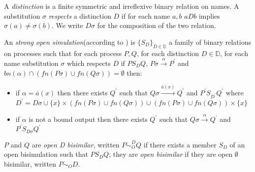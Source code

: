 \begin{definition}
  A \emph{distinction} is a finite symmetric and irreflexive binary relation on names. A substitution $\sigma$ \emph{respects} a distinction $D$ if for each name $a,b$ $aDb$ implies $\sigma(a)\neq \sigma(b)$. We write $D\sigma$ for the composition of the two relation.
\end{definition}


\begin{definition}
  An \emph{strong open simulation}(according to \cite{parrow}) is $\{S_{D}\}_{D\in \mathbb{D}}$ a family of binary relations on processes such that for each process $P, Q$, for each distinction $D\in \mathbb{D}$, for each name substitution $\sigma$ which respects $D$ if $P S_{D} Q$, $P\sigma \xrightarrow{\alpha} P^{'}$ and $bn(\alpha)\cap (fn(P\sigma)\cup fn(Q\sigma))=\emptyset$ then:
   \begin{itemize}
    \item 
      if $\alpha=\overline{a}(x)$ then there exists $Q^{'}$ such that $Q\sigma \xrightarrow{\overline{a}(x)} Q^{'}$ and $P^{'} S_{D^{'}} Q^{'}$ where $D^{'}=D\sigma \cup \{x\}\times (fn(P\sigma)\cup fn(Q\sigma)) \cup  (fn(P\sigma)\cup fn(Q\sigma))\times\{x\}$
    \item
      if $\alpha$ is not a bound output then there exists $Q^{'}$ such that $Q\sigma \xrightarrow{\alpha} Q^{'}$ and $P^{'} S_{D\sigma} Q^{'}$
  \end{itemize}
  $P$ and $Q$ are \emph{open D bisimilar}, written $P \dot{\sim}_{O}^{D} Q$ if there exists a member $S_{D}$ of an open bisimulation such that $P S_{D} Q$; they are \emph{open bisimilar} if they are open $\emptyset$ bisimilar, written $P \dot{\sim}_{O} D$.
\end{definition}
 
 















